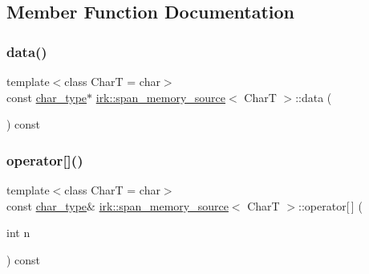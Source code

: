 \subsection{Member Function Documentation}
\mbox{\label{classirk_1_1span__memory__source_a117f7439cc35e16c02b3656104020ad3}} 
\subsubsection{\texorpdfstring{data()}{data()}}
{\footnotesize\ttfamily template$<$class CharT  = char$>$ \\
const \mbox{\hyperlink{classirk_1_1span__memory__source_a769d88b11f7c2882a006e93edb2cdb79}{char\+\_\+type}}$\ast$ \mbox{\hyperlink{classirk_1_1span__memory__source}{irk\+::span\+\_\+memory\+\_\+source}}$<$ CharT $>$\+::data (\begin{DoxyParamCaption}{ }\end{DoxyParamCaption}) const\hspace{0.3cm}{\ttfamily [inline]}}

\mbox{\label{classirk_1_1span__memory__source_a6edbac0e4fd45be9f2d651d3bfa431a1}} 
\subsubsection{\texorpdfstring{operator[]()}{operator[]()}}
{\footnotesize\ttfamily template$<$class CharT  = char$>$ \\
const \mbox{\hyperlink{classirk_1_1span__memory__source_a769d88b11f7c2882a006e93edb2cdb79}{char\+\_\+type}}\& \mbox{\hyperlink{classirk_1_1span__memory__source}{irk\+::span\+\_\+memory\+\_\+source}}$<$ CharT $>$\+::operator\mbox{[}$\,$\mbox{]} (\begin{DoxyParamCaption}\item[{int}]{n }\end{DoxyParamCaption}) const\hspace{0.3cm}{\ttfamily [inline]}}

